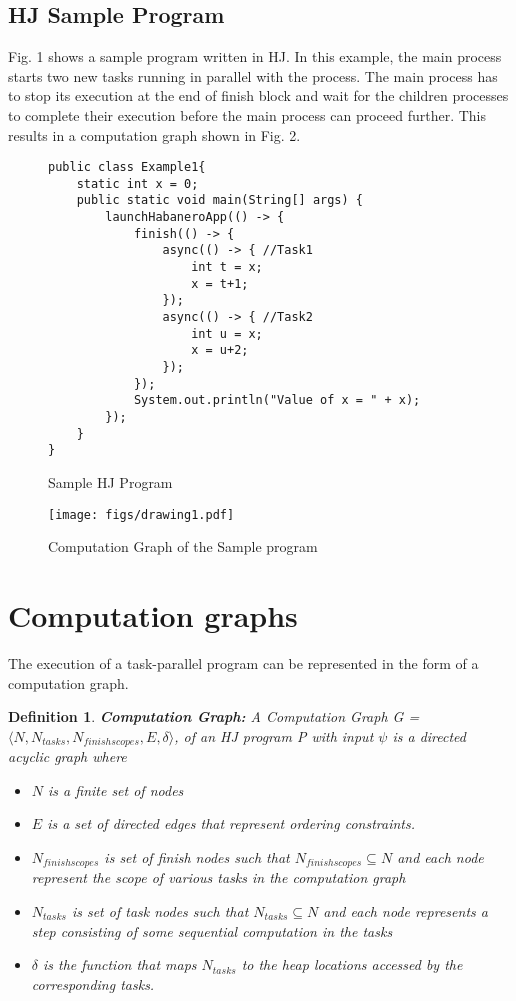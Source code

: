 \documentclass[10pt]{article}
\newtheorem{definition}{Definition}
\begin{document}
\subsection{\textbf{HJ Sample Program}}
Fig. 1 shows a sample program written in HJ. In this example, the main process starts two new tasks running in parallel with the process. The main process has to stop its execution at the end of finish block and wait for the children processes to complete their execution before the main process can proceed further. This results in a computation graph shown in Fig. 2. 

\begin{figure}[t]
  \begin{center}
    \begin{lstlisting}
public class Example1{
	static int x = 0;
	public static void main(String[] args) {
		launchHabaneroApp(() -> {
			finish(() -> {
				async(() -> { //Task1
					int t = x;
					x = t+1;
				});
				async(() -> { //Task2
					int u = x;
					x = u+2;		
				});
			});
			System.out.println("Value of x = " + x);	
		});
	}
}
\end{lstlisting}
  \end{center}
  \caption{Sample HJ Program}
  \label{fig:hj-async-finish-isolated}
\end{figure}

\begin{figure}[h]
  \centering
    \texttt{[image: figs/drawing1.pdf]}
    \caption{Computation Graph of the Sample program}
\end{figure}

\section{Computation graphs}

The execution of a task-parallel program can be represented in the form of a computation graph. 

\begin{definition}
\textbf{Computation Graph:} A Computation Graph G =$\langle N, N_{tasks}, N_{finishscopes}, E, \delta \rangle$, of an HJ program P with input $\psi$ is a directed acyclic graph where

\begin{itemize}
\item $N$ is a finite set of nodes
\item $E$ is a set of directed edges that represent ordering constraints. 
\item $N_{finishscopes}$ is set of finish nodes such that $N_{finishscopes} \subseteq N$ and each node represent the scope of various tasks in the computation graph
\item $ N_{tasks}$ is set of task nodes such that $ N_{tasks} \subseteq N$ and each node represents a step consisting of some sequential computation in the tasks
\item $\delta$ is the function that maps $N_{tasks}$ to the heap locations accessed by the corresponding tasks.
\end{itemize}
\end{definition}
\end{document}
